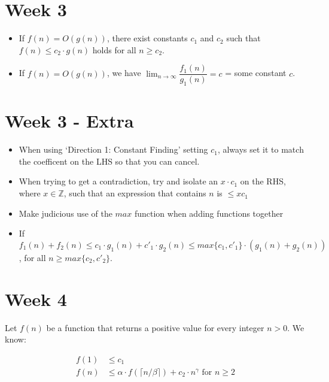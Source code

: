\documentclass[5pt,a4paper]{article}
\begin{document}
\begin{multicols}{3}

\section{Week 3}

\begin{itemize}
\item If $f(n) = O(g(n))$, there exist constants $c_1$ and $c_2$ such that $f(n) \leqslant c_2 \cdot g(n)$ holds for all $n \geqslant c_2$.
\item If $f(n) = O(g(n))$, we have $\lim_{n \to \infty} \dfrac{f_1(n)}{g_1(n)} = c$ = some constant $c$. 
\end{itemize}

\section{Week 3 - Extra}

\begin{itemize}
\item When using `Direction 1: Constant Finding' setting $c_1$, always set it to match the coefficent on the LHS so that you can cancel.
\item When trying to get a contradiction, try and isolate an $x \cdot c_1$ on the RHS, where $x \in \mathbb{Z}$, such that an expression that contains $n$ is $\leqslant xc_1$
\item Make judicious use of the $max$ function when adding functions together
\item If $f_1(n) + f_2(n) \leqslant c_1 \cdot g_1(n) +c'_1 \cdot g_2(n) \leqslant max\{c_1 , c'_1 \} \cdot (g_1(n) + g_2(n))$, for all $n \geqslant max\{c_2, c'_2\}$.
\end{itemize}

\section{Week 4}

Let $f(n)$ be a function that returns a positive value for every integer $n>0$. We know:

\begin{align*}
f(1) & \leqslant c_1\\
f(n) & \leqslant \alpha \cdot f(\lceil n / \beta \rceil) + c_2 \cdot n^{\gamma} \text{ for } n \geqslant 2
\end{align*}


\end{multicols}
\end{document}
